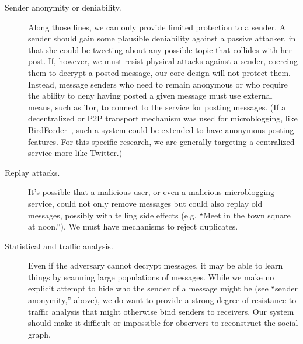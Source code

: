 \begin{description}
\item[Sender anonymity or deniability.] Along those lines, we can only
  provide limited protection to a sender. A sender should gain some plausible
  deniability against a passive attacker, in that she could be
  tweeting about any possible topic that collides with her post.
 If, however, we must resist physical attacks against a sender,
coercing them to decrypt a posted message, our core \hoot design
will not protect them.
Instead, message senders who need to remain anonymous or who require the
ability to deny having posted a given message must use external means,
such as Tor, to connect to the \hoot service for posting messages. (If a
decentralized or P2P transport mechanism was used for microblogging,
like BirdFeeder~\cite{sandler09}, such a system could be extended to have
anonymous posting features. For this specific research, we are
generally targeting a centralized service more like Twitter.)

\item[Replay attacks.] It's possible that a malicious user, or even a
  malicious microblogging service, could not only remove messages but
  could also replay old messages, possibly with telling side effects
  (e.g. ``Meet in the town square at noon.''). We must have 
  mechanisms to reject duplicates.

\item[Statistical and traffic analysis.] Even if the adversary cannot
  decrypt messages, it may be able to learn things by scanning large
  populations of \hoot messages. While we make no explicit attempt to hide who the
  sender of a message might be (see ``sender anonymity,'' above), we do
  want to provide a strong degree of resistance to traffic analysis that
  might otherwise bind senders to receivers. Our system should make it
  difficult or impossible for observers to reconstruct the social graph.


\end{description}
